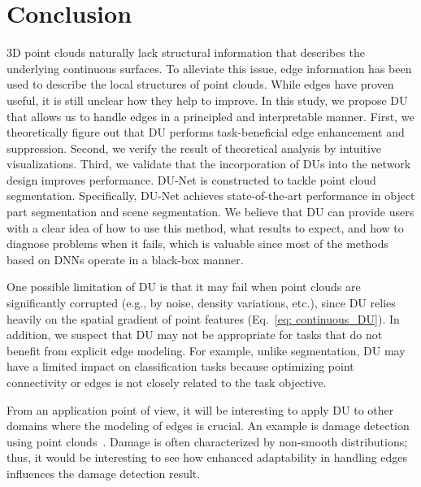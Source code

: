 \documentclass[a4paper,fleqn]{cas-dc}
\begin{document}
\section{Conclusion}
\label{sec:conclusion}
3D point clouds naturally lack structural information that describes the underlying continuous surfaces. To alleviate this issue, edge information has been used to describe the local structures of point clouds. While edges have proven useful, it is still unclear how they help to improve. In this study, we propose DU that allows us to handle edges in a principled and interpretable manner.
First, we theoretically figure out that DU performs task-beneficial edge enhancement and suppression. Second, we verify the result of theoretical analysis by intuitive visualizations. Third, we validate that the incorporation of DUs into the network design improves performance. 
DU-Net is constructed to tackle point cloud segmentation. Specifically, DU-Net achieves state-of-the-art performance in object part segmentation and scene segmentation. 
We believe that DU can provide users with a clear idea of how to use this method, what results to expect, and how to diagnose problems when it fails, which is valuable since most of the methods based on DNNs operate in a black-box manner. 

One possible limitation of DU is that it may fail when point clouds are significantly corrupted (e.g., by noise, density variations, etc.), since DU relies heavily on the spatial gradient of point features (Eq.~\eqref{eq: continuous_DU}). In addition, we suspect that DU may not be appropriate for tasks that do not benefit from explicit edge modeling. For example, unlike segmentation, DU may have a limited impact on classification tasks because optimizing point connectivity or edges is not closely related to the task objective.

From an application point of view, it will be interesting to apply DU to other domains where the modeling of edges is crucial. An example is damage detection using point clouds~\cite{xiu2020collapsed}. Damage is often characterized by non-smooth distributions; thus, it would be interesting to see how enhanced adaptability in handling edges influences the damage detection result.      
\end{document}
